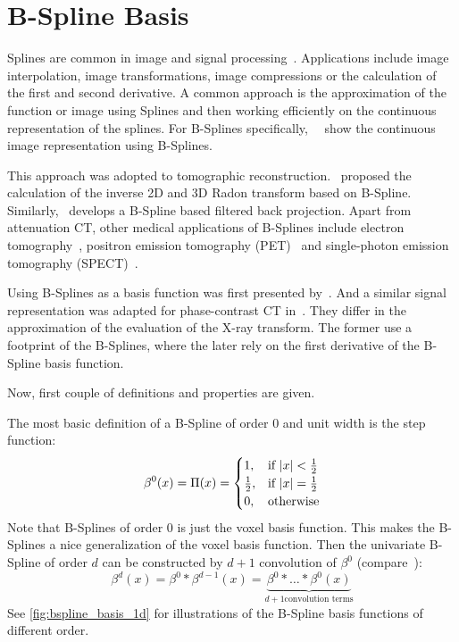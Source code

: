 \section{B-Spline Basis}\label{sec:bspline_basis}

Splines are common in image and signal processing~\cite{unser_splines_1999}. Applications include
image interpolation, image transformations, image compressions or the calculation of the first and
second derivative. A common approach is the approximation of the function or image using Splines and
then working efficiently on the continuous representation of the splines. For B-Splines
specifically,~\citeauthor*{unser_fast_1991}~\cite{unser_fast_1991} show the continuous image
representation using B-Splines.

This approach was adopted to tomographic reconstruction.~\cite{la_riviere_spline-based_1998}
proposed the calculation of the inverse 2D and 3D Radon transform based on B-Spline.
Similarly,~\cite{horbelt_discretization_2002} develops a B-Spline based filtered back projection.
Apart from attenuation CT, other medical applications of B-Splines include electron
tomography~\cite{tran_robust_2013, tran_inverse_2014}, positron emission tomography
(PET)~\cite{nichols_spatiotemporal_2002, li_fast_2007, verhaeghe_investigation_2007} and
single-photon emission tomography (SPECT)~\cite{guedon_b-spline_1991, reutter_fully_2007}.

Using B-Splines as a basis function was first presented by~\cite{momey_new_2011,
	momey_b-spline_2012, momey_spline_2015}. And a similar signal representation was adapted for
phase-contrast CT in~\cite{nilchian_fast_2013, nilchian_differential_2012, nilchian_spline_2015}.
They differ in the approximation of the evaluation of the X-ray transform. The former use a
footprint of the B-Splines, where the later rely on the first derivative of the B-Spline basis
function.

Now, first couple of definitions and properties are given.
\begin{definition}[B-Spline]
	The most basic definition of a B-Spline of order \(0\) and unit width is the step function:
	\[
		\beta^0(x) = \Pi(x) =
		\begin{cases}
			1,           & \text{if } \lvert x\rvert < \frac{1}{2} \\
			\frac{1}{2}, & \text{if } \lvert x\rvert = \frac{1}{2} \\
			0,           & \text{otherwise}
		\end{cases}
	\]
	Note that B-Splines of order \(0\) is just the voxel basis function. This makes the
	B-Splines a nice generalization of the voxel basis function. Then the univariate B-Spline of
	order \(d\) can be constructed by \(d + 1\) convolution of
	\(\beta^0\) (compare~\cite{momey_new_2011}):
	\[
		\beta^d(x) = \beta^0 * \beta^{d-1}(x) = \underbrace{\beta^0 * \dots * \beta^0(x)}_{d+1 \text{convolution terms}}
	\]
	See \autoref{fig:bspline_basis_1d} for illustrations of the B-Spline basis functions of
	different order.
\end{definition}

